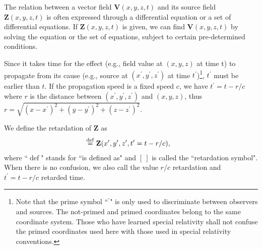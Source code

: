 \documentclass[11pt]{article}              %
\begin{document}
The relation between a vector field ${\mathbf V(x,y,z,t)}$ and its source field ${\mathbf Z(x,y,z,t)}$ is often expressed through a differential equation or a set of differential equations. If ${\mathbf Z(x,y,z,t)}$ is given, we can find ${\mathbf V(x,y,z,t)}$ by solving the equation or the set of equations, subject to certain pre-determined conditions.



Since it takes time for the effect (e.g., field value at $(x,y,z)$ at time t) to propagate from its cause (e.g., source at $(x^\prime,y^\prime,z^\prime)$ at time $t^\prime$)\footnote{Note that the prime symbol ``$^\prime$" is only used to discriminate between observers and sources. The not-primed and primed coordinates belong to the same coordinate system. Those who have learned special relativity shall not confuse the primed coordinates used here with those used in special relativity conventions.}, $t^\prime$ must be earlier than $t$. If the propagation speed is a fixed speed $c$, we have $t^\prime=t-r/c$ where $r$ is the distance between $(x^\prime,y^\prime,z^\prime)$ and $(x,y,z)$, thus $r=\sqrt{(x-x^\prime)^2+(y-y^\prime)^2+(z-z^\prime)^2}$. 

We define the retardation of ${\mathbf Z}$ as
\begin{align}
[\mathbf Z]&\stackrel{\operatorname{def}}{=}{\mathbf Z}(x^\prime,y^\prime,z^\prime,t^\prime=t-r/c),\notag
\end{align}
where ``$\operatorname{def}$" stands for ``is defined as"
and $[\ ]$ is called the ``retardation symbol". When there is no confusion, we also call the value $r/c$ retardation and $t^\prime=t-r/c$ retarded time.
\end{document}
